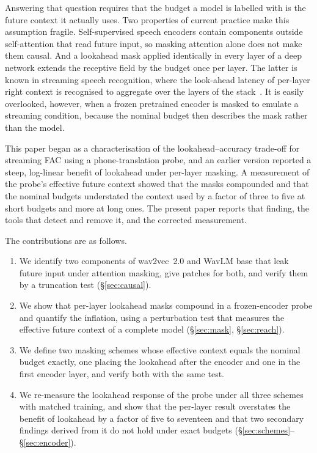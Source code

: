 \documentclass[journal]{IEEEtran}
\begin{document}
Answering that question requires that the budget a model is labelled with is
the future context it actually uses. Two properties of current practice make
this assumption fragile. Self-supervised speech encoders contain components
outside self-attention that read future input, so masking attention alone does
not make them causal. And a lookahead mask applied identically in every layer
of a deep network extends the receptive field by the budget once per layer.
The latter is known in streaming speech recognition, where the look-ahead
latency of per-layer right context is recognised to aggregate over the layers
of the stack~\cite{zhang2020transformertransducer}. It is easily overlooked,
however, when a frozen pretrained encoder is masked to emulate a streaming
condition, because the nominal budget then describes the mask rather than the
model.

This paper began as a characterisation of the lookahead--accuracy trade-off
for streaming FAC using a phone-translation probe, and an earlier version
reported a steep, log-linear benefit of lookahead under per-layer masking. A
measurement of the probe's effective future context showed that the masks
compounded and that the nominal budgets understated the context used by a
factor of three to five at short budgets and more at long ones. The present paper reports that finding, the tools
that detect and remove it, and the corrected measurement.

The contributions are as follows.
\begin{enumerate}\itemsep1pt
\item We identify two components of wav2vec~2.0 and WavLM base that leak future
      input under attention masking, give patches for both, and verify them by
      a truncation test (\S\ref{sec:causal}).
\item We show that per-layer lookahead masks compound in a frozen-encoder
      probe and quantify the inflation, using a perturbation test that
      measures the effective future context of a complete model
      (\S\ref{sec:mask}, \S\ref{sec:reach}).
\item We define two masking schemes whose effective context equals the
      nominal budget exactly, one placing the lookahead after the encoder and
      one in the first encoder layer, and verify both with the same test.
\item We re-measure the lookahead response of the probe under all three
      schemes with matched training, and show that the per-layer result
      overstates the benefit of lookahead by a factor of five to seventeen
      and that two secondary findings derived from it do not hold under exact
      budgets (\S\ref{sec:schemes}--\S\ref{sec:encoder}).
\end{enumerate}
\end{document}
